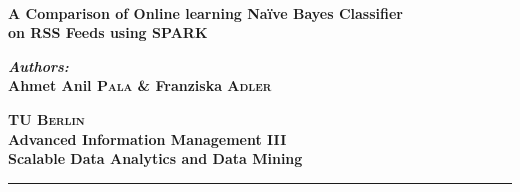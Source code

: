 \documentclass[a0,portrait]{a0poster}
\begin{document}
\pagecolor[rgb]{0.9,0.925,0.9}
 \begin{center}
    {\huge \textbf{\\A Comparison of Online learning Na\"ive Bayes Classifier\\ on RSS Feeds using SPARK\\}}
  \end{center}
\begin{minipage}{0.4\textwidth}
\begin{flushleft} \large
\textbf{\emph{Authors:}\\
Ahmet Anil \textsc{Pala} \& Franziska \textsc{Adler}}\\
\end{flushleft}
\end{minipage}
\hfill
\begin{minipage}{0.4\textwidth}
\begin{flushright} \large
\textbf{\textsc{\color{darkred} \Large TU Berlin}\\
Advanced Information Management III\\
Scalable Data Analytics and Data Mining}
\end{flushright}
\end{minipage}
\newcommand{\HRule}{\rule[-10mm]{805mm}{1mm}} \HRule \\[0.5cm] %


\vspace{0.8cm}
\hspace{0.8cm}
\hspace{0.8cm}


\vspace{0.8cm}
\end{document}
